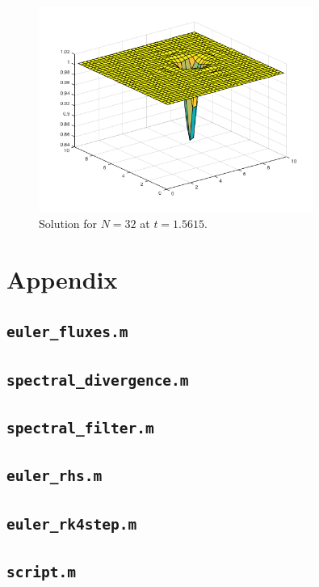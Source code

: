\documentclass[10pt]{article}
\begin{document}
\begin{figure}[H]
\centering
\includegraphics[width=0.8\textwidth]{figures/100dt.png}
\caption{Solution for \(N=32\) at \(t=1.5615\).}
\label{fig:100dt}
\end{figure}








\section{Appendix}
\subsection{{\tt euler\_fluxes.m}}

\subsection{{\tt spectral\_divergence.m}}

\subsection{{\tt spectral\_filter.m}}

\subsection{{\tt euler\_rhs.m}}

\subsection{{\tt euler\_rk4step.m}}

\subsection{{\tt script.m}}

\end{document}
